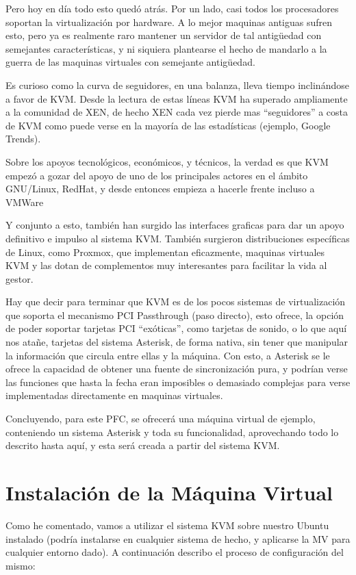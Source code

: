 Pero hoy en día todo esto quedó atrás. Por un lado, casi todos los procesadores soportan la virtualización por hardware. A lo mejor maquinas antiguas sufren esto, pero ya es realmente raro mantener un servidor de tal antigüedad con semejantes características, y ni siquiera plantearse el hecho de mandarlo a la guerra de las maquinas virtuales con semejante antigüedad.

Es curioso como la curva de seguidores, en una balanza, lleva tiempo inclinándose a favor de KVM. Desde la lectura de estas líneas KVM ha superado ampliamente a la comunidad de XEN, de hecho XEN cada vez pierde mas “seguidores” a costa de KVM como puede verse en la mayoría de las estadísticas (ejemplo, Google Trends).

Sobre los apoyos tecnológicos, económicos, y técnicos, la verdad es que KVM empezó a gozar del apoyo de uno de los principales actores en el ámbito GNU/Linux, RedHat, y desde entonces empieza a hacerle frente incluso a VMWare

Y conjunto a esto, también han surgido las interfaces graficas para dar un apoyo definitivo e impulso al sistema KVM. También surgieron distribuciones específicas de Linux, como Proxmox, que implementan eficazmente, maquinas virtuales KVM y las dotan de complementos muy interesantes para facilitar la vida al gestor.

Hay que decir para terminar que KVM es de los pocos sistemas de virtualización que soporta el mecanismo PCI Passthrough (paso directo), esto ofrece, la opción de poder soportar tarjetas PCI “exóticas”, como tarjetas de sonido, o lo que aquí nos atañe, tarjetas del sistema Asterisk, de forma nativa, sin tener que manipular la información que circula entre ellas y la máquina. Con esto, a Asterisk se le ofrece la capacidad de obtener una fuente de sincronización pura, y podrían verse las funciones que hasta la fecha eran imposibles o demasiado complejas para verse implementadas directamente en maquinas virtuales.

Concluyendo, para este PFC, se ofrecerá una máquina virtual de ejemplo, conteniendo un sistema Asterisk y toda su funcionalidad, aprovechando todo lo descrito hasta aquí, y esta será creada a partir del sistema KVM.

\section{Instalación de la Máquina Virtual}

Como he comentado, vamos a utilizar el sistema KVM sobre nuestro Ubuntu instalado (podría instalarse en cualquier sistema de hecho, y aplicarse la MV para cualquier entorno dado). A continuación describo el proceso de configuración del mismo:

